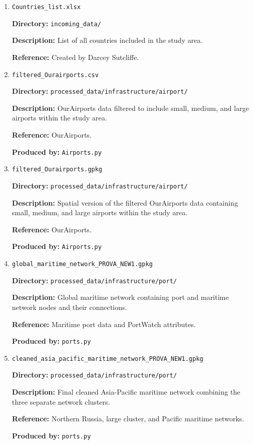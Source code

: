 \documentclass[11pt,a4paper]{article}
\begin{document}
\begin{enumerate}
\medskip

\item \texttt{Countries\_list.xlsx}\par
\textbf{Directory:} \texttt{incoming\_data/}\par
\textbf{Description:} List of all countries included in the study area.\par
\textbf{Reference:} Created by Darcey Sutcliffe.\par

\medskip

\item \texttt{filtered\_Ourairports.csv}\par
\textbf{Directory:} \texttt{processed\_data/infrastructure/airport/}\par
\textbf{Description:} OurAirports data filtered to include small, medium, and large airports within the study area.\par
\textbf{Reference:} OurAirports.\par
\textbf{Produced by:} \texttt{Airports.py}\par

\medskip

\item \texttt{filtered\_Ourairports.gpkg}\par
\textbf{Directory:} \texttt{processed\_data/infrastructure/airport/}\par
\textbf{Description:} Spatial version of the filtered OurAirports data containing small, medium, and large airports within the study area.\par
\textbf{Reference:} OurAirports.\par
\textbf{Produced by:} \texttt{Airports.py}\par

\medskip

\item \texttt{global\_maritime\_network\_PROVA\_NEW1.gpkg}\par
\textbf{Directory:} \texttt{processed\_data/infrastructure/port/}\par
\textbf{Description:} Global maritime network containing port and maritime network nodes and their connections.\par
\textbf{Reference:} Maritime port data and PortWatch attributes.\par
\textbf{Produced by:} \texttt{ports.py}\par

\medskip

\item \texttt{cleaned\_asia\_pacific\_maritime\_network\_PROVA\_NEW1.gpkg}\par
\textbf{Directory:} \texttt{processed\_data/infrastructure/port/}\par
\textbf{Description:} Final cleaned Asia-Pacific maritime network combining the three separate network clusters.\par
\textbf{Reference:} Northern Russia, large cluster, and Pacific maritime networks.\par
\textbf{Produced by:} \texttt{ports.py}\par


\end{enumerate}
\end{document}
